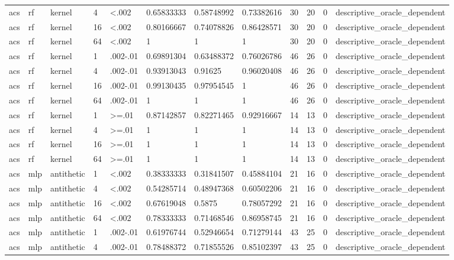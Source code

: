 \begin{tabular}{llllllllllll}
acs & rf & kernel & 4 & <.002 & 0.65833333 & 0.58748992 & 0.73382616 & 30 & 20 & 0 & descriptive\_oracle\_dependent \\
acs & rf & kernel & 16 & <.002 & 0.80166667 & 0.74078826 & 0.86428571 & 30 & 20 & 0 & descriptive\_oracle\_dependent \\
acs & rf & kernel & 64 & <.002 & 1 & 1 & 1 & 30 & 20 & 0 & descriptive\_oracle\_dependent \\
acs & rf & kernel & 1 & .002-.01 & 0.69891304 & 0.63488372 & 0.76026786 & 46 & 26 & 0 & descriptive\_oracle\_dependent \\
acs & rf & kernel & 4 & .002-.01 & 0.93913043 & 0.91625 & 0.96020408 & 46 & 26 & 0 & descriptive\_oracle\_dependent \\
acs & rf & kernel & 16 & .002-.01 & 0.99130435 & 0.97954545 & 1 & 46 & 26 & 0 & descriptive\_oracle\_dependent \\
acs & rf & kernel & 64 & .002-.01 & 1 & 1 & 1 & 46 & 26 & 0 & descriptive\_oracle\_dependent \\
acs & rf & kernel & 1 & >=.01 & 0.87142857 & 0.82271465 & 0.92916667 & 14 & 13 & 0 & descriptive\_oracle\_dependent \\
acs & rf & kernel & 4 & >=.01 & 1 & 1 & 1 & 14 & 13 & 0 & descriptive\_oracle\_dependent \\
acs & rf & kernel & 16 & >=.01 & 1 & 1 & 1 & 14 & 13 & 0 & descriptive\_oracle\_dependent \\
acs & rf & kernel & 64 & >=.01 & 1 & 1 & 1 & 14 & 13 & 0 & descriptive\_oracle\_dependent \\
acs & mlp & antithetic & 1 & <.002 & 0.38333333 & 0.31841507 & 0.45884104 & 21 & 16 & 0 & descriptive\_oracle\_dependent \\
acs & mlp & antithetic & 4 & <.002 & 0.54285714 & 0.48947368 & 0.60502206 & 21 & 16 & 0 & descriptive\_oracle\_dependent \\
acs & mlp & antithetic & 16 & <.002 & 0.67619048 & 0.5875 & 0.78057292 & 21 & 16 & 0 & descriptive\_oracle\_dependent \\
acs & mlp & antithetic & 64 & <.002 & 0.78333333 & 0.71468546 & 0.86958745 & 21 & 16 & 0 & descriptive\_oracle\_dependent \\
acs & mlp & antithetic & 1 & .002-.01 & 0.61976744 & 0.52946654 & 0.71279144 & 43 & 25 & 0 & descriptive\_oracle\_dependent \\
acs & mlp & antithetic & 4 & .002-.01 & 0.78488372 & 0.71855526 & 0.85102397 & 43 & 25 & 0 & descriptive\_oracle\_dependent \\

\end{tabular}
